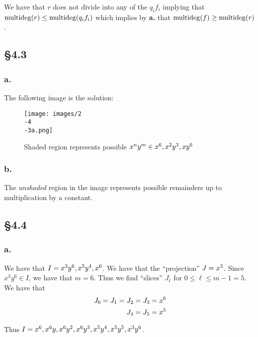 \documentclass[letterpaper]{article}
\begin{document}
We have that $r$ does not divide into any of the $q_{i}f_{i}$ implying that $\operatorname{multideg}(r) \leq \operatorname{multideg}(q_{i} f_{i})$ which implies by \textbf{a.} that $\operatorname{multideg}(f) \geq \operatorname{multideg}(r)$.

\subsection*{\S 4.3}

\subsubsection*{a.}

The following image is the solution:

\begin{figure}[H]
  \centering
  \texttt{[image: images/2\\-4\\-3a.png]}
  \caption{Shaded region represents possible $x^{n}y^{m} \in \gen{x^{6}, x^{2}y^{3}, xy^{6}}$}
\end{figure}

\subsubsection*{b.}

The \emph{unshaded} region in the image represents possible remainders up to multiplication by a constant. 

\clearpage

\subsection*{\S 4.4}

\subsubsection*{a.}

We have that $I = \gen{x^{3}y^{6}, x^{5}y^{4}, x^{6}}$. We have that the ``projection'' $J = \gen{x^{3}}$. Since $x^{3}y^{6} \in I$, we have that $m = 6$. Thus we find ``slices'' $J_{\ell}$ for $0 \leq \ell \leq m - 1 = 5$. We have that
\begin{align*}
  J_{0} = J_{1} = J_{2} = J_{3} &= \gen{x^{6}} \\
  J_{4} = J_{5} &= \gen{x^{5}} \\
\end{align*}

Thus $I = \gen{x^{6}, x^{6}y, x^{6}y^{2}, x^{6}y^{3}, x^{5}y^{4}, x^{5}y^{5}, x^{3}y^{6}}$.
\end{document}
